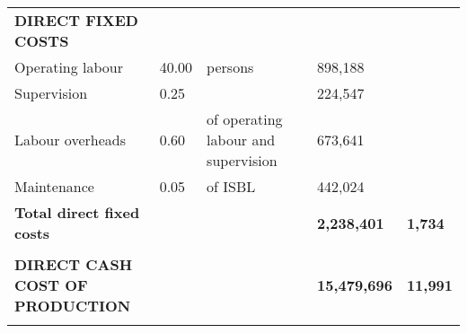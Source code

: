 \begin{table}[H]
\begin{tabular}{llllll}
\textbf{DIRECT FIXED COSTS}                   &                                        &                                                                    &                             & \textbf{}             &                                          \\
Operating labour                              & 40.00                                  & persons                                                            &                             & 898,188               &                                          \\
Supervision                                   & 0.25                                   &                                                                    &                             & 224,547               &                                          \\
Labour overheads                              & 0.60                                   & of operating labour and   supervision                              &                             & 673,641               &                                          \\
Maintenance                                   & 0.05                                   & of ISBL                                                            &                             & 442,024               &                                          \\ \cline{5-6} 
\textbf{Total direct fixed costs}             &                                        &                                                                    &                             & \textbf{2,238,401}    & \textbf{1,734}                           \\
                                              &                                        &                                                                    &                             & \textbf{}             &                                          \\ \cline{5-6} 
\textbf{DIRECT CASH COST OF PRODUCTION}       &                                        &                                                                    &                             & \textbf{15,479,696}   & \textbf{11,991}                          \\
                                              &                                        &                                                                    &                             & \textbf{}             &                                          \\

\end{tabular}
\end{table}
